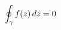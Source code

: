 \documentclass[preview]{standalone}
\begin{document}
\begin{align*}
\special{dvisvgm:raw <g id='unique000'>}\oint_{\gamma} f(z)\, dz = 0\special{dvisvgm:raw </g>}
\end{align*}
\end{document}
